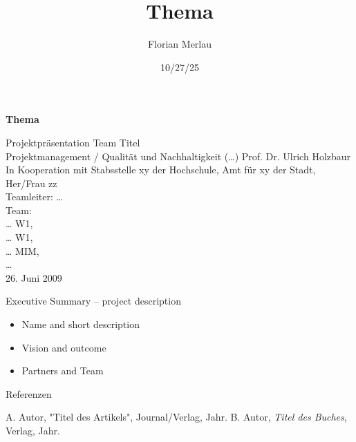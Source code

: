 \documentclass[aspectratio=169,10pt]{beamer}
\title[Thema]{Thema}
\author[Merlau]{Florian Merlau}
\institute[Amster Informatik]{Amster Informatik}
\date{10/27/25}
\begin{document}
\begin{frame}

\vspace{1cm}
\begin{flushleft}
    {\bfseries\LARGE Thema}
\end{flushleft}

\vspace{1cm}
\justifying
\small
Projektpräsentation Team Titel\\
Projektmanagement / Qualität und Nachhaltigkeit (…)
Prof. Dr. Ulrich Holzbaur\\[0.5em]
In Kooperation mit Stabsstelle xy der Hochschule, Amt für xy der Stadt, Her/Frau zz\\[0.5em]
Teamleiter: …\\[0.5em]
Team: \\
… W1, \\
… W1, \\
… MIM, \\
…\\[0.5em]
26. Juni 2009

\end{frame}

\begin{frame}{Executive Summary – project description}
\begin{itemize}
    \item Name and short description
    \item Vision and outcome
    \item Partners and Team
\end{itemize}
\end{frame}

\begin{frame}[allowframebreaks]{Referenzen}
\footnotesize
\begin{thebibliography}{9}
 A. Autor, "Titel des Artikels", Journal/Verlag, Jahr.
 B. Autor, \emph{Titel des Buches}, Verlag, Jahr.
\end{thebibliography}
\end{frame}
\end{document}

